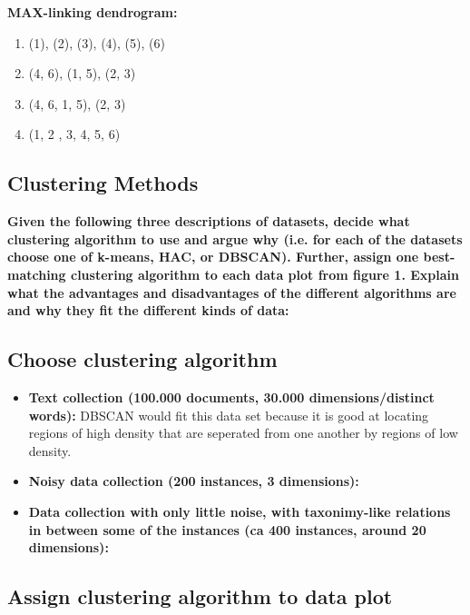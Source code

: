 		{\bf MAX-linking dendrogram:}
			\begin{enumerate}
				\item (1), (2), (3), (4), (5), (6)
				\item (4, 6), (1,  5), (2, 3)
				\item (4, 6, 1, 5), (2, 3)
				\item (1, 2 , 3, 4, 5, 6)
			\end{enumerate}


 
	\clearpage
	\subsection{Clustering Methods}
		{\bf Given the following three descriptions of datasets, decide what clustering algorithm
		to use and argue why (i.e. for each of the datasets choose one of k-means, HAC, or DBSCAN).
		Further, assign one best-matching clustering algorithm to each data plot from figure 1. Explain
		what the advantages and disadvantages of the different algorithms are and why they fit
		the different kinds of data:}

		\noindent\makebox[\linewidth]{\rule{\textwidth}{1pt}} 

		\subsection*{Choose clustering algorithm}
		
		\begin{itemize}
			\item {\bf Text collection (100.000 documents, 30.000 dimensions/distinct words):}
			DBSCAN would fit this data set because it is good at locating regions of high density that
			are seperated from one another by regions of low density. 
			
			\item {\bf Noisy data collection (200 instances, 3 dimensions):}

			\item {\bf Data collection with only little noise, with taxonimy-like relations in 
			between some of the instances (ca 400 instances, around 20 dimensions):}

		\end{itemize}

		\noindent\makebox[\linewidth]{\rule{\textwidth}{1pt}} 

		\subsection*{Assign clustering algorithm to data plot}


